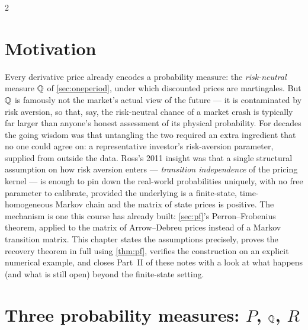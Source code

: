 \begin{paracol}{2}
\section*{Motivation}
Every derivative price already encodes a probability measure: the \emph{risk-neutral} measure $\mathbb{Q}$ of
\cref{sec:oneperiod}, under which discounted prices are martingales. But $\mathbb{Q}$ is famously not the market's
actual view of the future --- it is contaminated by risk aversion, so that, say, the risk-neutral chance of
a market crash is typically far larger than anyone's honest assessment of its physical probability. For
decades the going wisdom was that untangling the two required an extra ingredient that no one could agree
on: a representative investor's risk-aversion parameter, supplied from outside the data. Ross's 2011
insight was that a single structural assumption on how risk aversion enters --- \emph{transition
independence} of the pricing kernel --- is enough to pin down the real-world probabilities uniquely, with
no free parameter to calibrate, provided the underlying is a finite-state, time-homogeneous Markov chain
and the matrix of state prices is positive. The mechanism is one this course has already built:
\cref{sec:pf}'s Perron--Frobenius theorem, applied to the matrix of Arrow--Debreu prices instead of a
Markov transition matrix. This chapter states the assumptions precisely, proves the recovery theorem in
full using \cref{thm:pf}, verifies the construction on an explicit numerical example, and closes Part~II of
these notes with a look at what happens (and what is still open) beyond the finite-state setting.

\section{Three probability measures: \texorpdfstring{$P$, $\mathbb{Q}$, $R$}{P, Q, R}}\label{ch25:sec-pqr}


\end{paracol}
